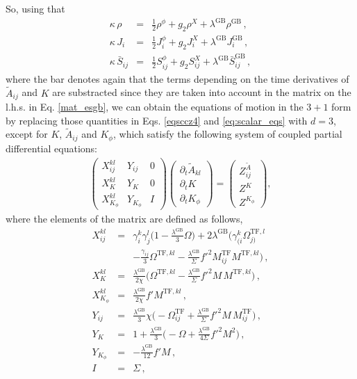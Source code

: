 \documentclass[reprint,aps,amsmath,amssymb,twoside,prd,showkeys,superscriptaddress,nofootinbib]{revtex4-2}
\begin{document}
So, using that 
\begin{subequations}
\begin{eqnarray}
\kappa\,\rho&=&\tfrac{1}{2}\rho^{\phi}+g_2\rho^X+\lambda^{\text{GB}}\rho^{\text{GB}}\,,\\ \kappa\,J_i&=&\tfrac{1}{2}J_i^{\phi}+g_2J_i^X+\lambda^{\text{GB}}J_i^{\text{GB}}\,,\\
\kappa\,\bar{S}_{ij}&=&\tfrac{1}{2}S_{ij}^{\phi}+g_2S_{ij}^X+\lambda^{\text{GB}}\bar{S}_{ij}^{\text{GB}}\,,
\end{eqnarray}
\end{subequations}
where the bar denotes again that the terms depending on the time derivatives of ${\tilde{A}}_{ij}$ and $K$ are substracted since they are taken into account in the matrix on the l.h.s. in Eq. \eqref{mat_esgb}, we can obtain the equations of motion in the $3+1$ form by replacing those quantities in Eqs. \eqref{eqsccz4} and \eqref{eq:scalar_eqs} with $d=3$, except for $K$, $\tilde{A}_{ij}$ and $K_{\phi}$, which satisfy the following system of coupled partial differential equations:
\begin{eqnarray}\label{mat_esgb}
\begin{pmatrix} X^{kl}_{ij} & Y_{ij} & 0 \\ X^{kl}_K & Y_K & 0 \\ X^{kl}_{K_{\phi}} & Y_{K_{\phi}} & I \end{pmatrix}
\begin{pmatrix} \partial_t \tilde{A}_{kl} \\ \partial_tK \\ \partial_tK_{\phi} \end{pmatrix}=
\begin{pmatrix} Z_{ij}^{\tilde{A}} \\ Z^K \\ Z^{K_{\phi}} \end{pmatrix},
\end{eqnarray}
where the elements of the matrix are defined as follows,
\begin{subequations}
\begin{eqnarray}
X_{ij}^{kl}&=& \gamma_i^k\gamma_j^l\big(1-\tfrac{\lambda^{\text{GB}}}{3}\Omega \big)+2\lambda^{\text{GB}}\big(\gamma_{(i}^k\Omega_{j)}^{\text{TF},l}\nonumber\\&& -\tfrac{\gamma_{ij}}{3}\Omega^{\text{TF},kl}-\tfrac{\lambda^{\text{GB}}}{\Sigma} f'^2M^{\text{TF}}_{ij}M^{\text{TF},kl}\big)\,,\\
X_K^{kl}&=&\tfrac{\lambda^{\text{GB}}}{2\chi}\big(\Omega^{\text{TF},kl}-\tfrac{\lambda^{\text{GB}}}{\Sigma}f'^2M\,M^{\text{TF},kl}\big)\,, \\
X_{K_{\phi}}^{kl}&=&\tfrac{\lambda^{\text{GB}}}{2\chi}f'M^{\text{TF},kl}\,, \\
Y_{ij}&=&\tfrac{\lambda^{\text{GB}}}{3}\chi\big(-\Omega^{\text{TF}}_{ij}+\tfrac{\lambda^{\text{GB}}}{\Sigma}f'^2M\,M^{\text{TF}}_{ij} \big)\,, \\
Y_K&=&1+\tfrac{\lambda^{\text{GB}}}{3}\big(-\Omega+\tfrac{\lambda^{\text{GB}}}{4\Sigma}f'^2M^2 \big)\,,\\
Y_{K_{\phi}}&=&-\tfrac{\lambda^{\text{GB}}}{12}f'M\,, \\
I&=&\Sigma\,,
\end{eqnarray}
\end{subequations}
\end{document}
